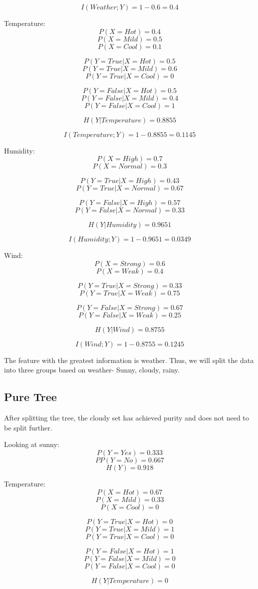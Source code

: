 \documentclass{article}
\begin{document}
\[I(Weather;Y) = 1 - 0.6 = 0.4\]

Temperature:
\[P(X = Hot) =  0.4\]
\[P(X = Mild) = 0.5 \]
\[P(X = Cool) = 0.1 \]

\[P(Y= True | X = Hot) = 0.5 \]
\[P(Y= True | X = Mild) = 0.6 \]
\[P(Y= True | X = Cool) = 0 \]

\[P(Y = False | X = Hot) = 0.5 \]
\[P(Y = False | X = Mild) = 0.4\]
\[P(Y = False | X = Cool) = 1\]

\[H(Y|Temperature) = 0.8855\]

\[I(Temperature;Y) = 1 - 0.8855 = 0.1145\]

Humidity:
\[P(X = High) =  0.7\]
\[P(X = Normal) = 0.3 \]

\[P(Y= True | X = High) = 0.43 \]
\[P(Y= True | X = Normal) = 0.67 \]

\[P(Y = False | X = High) = 0.57 \]
\[P(Y = False | X = Normal) = 0.33\]

\[H(Y|Humidity) = 0.9651\]

\[I(Humidity;Y) = 1 - 0.9651 = 0.0349\]

Wind:
\[P(X = Strong) =  0.6\]
\[P(X = Weak) = 0.4 \]

\[P(Y= True | X = Strong) = 0.33 \]
\[P(Y= True | X = Weak) = 0.75 \]

\[P(Y = False | X = Strong) = 0.67 \]
\[P(Y = False | X = Weak) = 0.25\]

\[H(Y|Wind) = 0.8755\]

\[I(Wind;Y) = 1 - 0.8755 = 0.1245\]

The feature with the greatest information is weather. Thus, we will split the data into three groups based on weather- Sunny, cloudy, rainy.

\subsection{Pure Tree}
After splitting the tree, the cloudy set has achieved purity and does not need to be split further.

Looking at sunny:
\[P(Y = Yes) = 0.333\]
\[PP(Y = No) = 0.667\]
\[H(Y) = 0.918\]

Temperature:
\[P(X = Hot) =  0.67\]
\[P(X = Mild) = 0.33 \]
\[P(X = Cool) = 0\]

\[P(Y= True | X = Hot) = 0 \]
\[P(Y= True | X = Mild) = 1 \]
\[P(Y= True | X = Cool) = 0 \]

\[P(Y = False | X = Hot) = 1 \]
\[P(Y = False | X = Mild) = 0\]
\[P(Y = False | X = Cool) = 0\]

\[H(Y|Temperature) = 0\]
\end{document}
